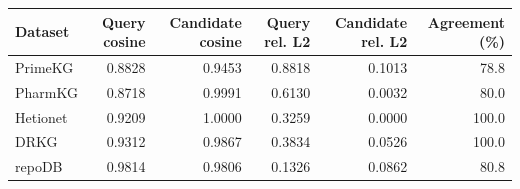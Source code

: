 \begin{tabular}{lrrrrr}
\toprule
Dataset & Query cosine & Candidate cosine & Query rel. L2 & Candidate rel. L2 & Agreement (\%) \\
\midrule
PrimeKG & 0.8828 & 0.9453 & 0.8818 & 0.1013 & 78.8 \\
PharmKG & 0.8718 & 0.9991 & 0.6130 & 0.0032 & 80.0 \\
Hetionet & 0.9209 & 1.0000 & 0.3259 & 0.0000 & 100.0 \\
DRKG & 0.9312 & 0.9867 & 0.3834 & 0.0526 & 100.0 \\
repoDB & 0.9814 & 0.9806 & 0.1326 & 0.0862 & 80.8 \\
\bottomrule
\end{tabular}
